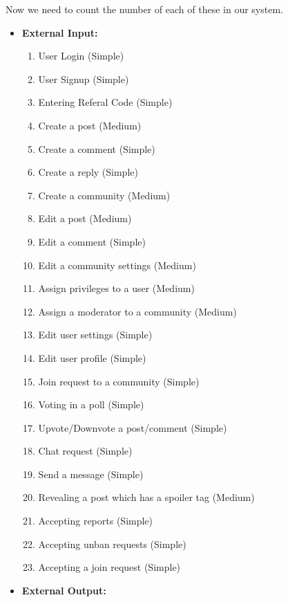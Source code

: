 \documentclass[11pt]{article}
\begin{document}
Now we need to count the number of each of these in our system.\\

\begin{itemize}
    \item \textbf{External Input:}
          \begin{enumerate}
              \item User Login (Simple)
              \item User Signup (Simple)
              \item Entering Referal Code (Simple)
              \item Create a post (Medium)
              \item Create a comment (Simple)
              \item Create a reply (Simple)
              \item Create a community (Medium)
              \item Edit a post (Medium)
              \item Edit a comment (Simple)
              \item Edit a community settings (Medium)
              \item Assign privileges to a user (Medium)
              \item Assign a moderator to a community (Medium)
              \item Edit user settings (Simple)
              \item Edit user profile (Simple)
              \item Join request to a community (Simple)
              \item Voting in a poll (Simple)
              \item Upvote/Downvote a post/comment (Simple)
              \item Chat request (Simple)
              \item Send a message (Simple)
              \item Revealing a post which has a spoiler tag (Medium)
              \item Accepting reports (Simple)
              \item Accepting unban requests (Simple)
              \item Accepting a join request (Simple)
          \end{enumerate}
    \item \textbf{External Output:}
          \begin{enumerate}

\end{enumerate}
\end{itemize}
\end{document}
